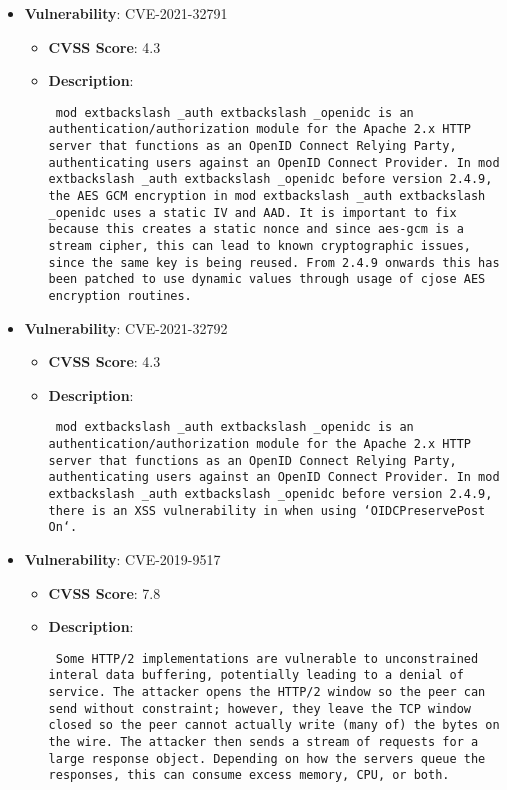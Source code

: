 \documentclass{article}
\begin{document}
\begin{itemize}
        \item \textbf{Vulnerability}: CVE-2021-32791
        \begin{itemize}
            \item \textbf{CVSS Score}:  4.3 
            \item \textbf{Description}: \parbox{\linewidth}{\texttt{ mod	extbackslash _auth	extbackslash _openidc is an authentication/authorization module for the Apache 2.x HTTP server that functions as an OpenID Connect Relying Party, authenticating users against an OpenID Connect Provider. In mod	extbackslash _auth	extbackslash _openidc before version 2.4.9, the AES GCM encryption in mod	extbackslash _auth	extbackslash _openidc uses a static IV and AAD. It is important to fix because this creates a static nonce and since aes-gcm is a stream cipher, this can lead to known cryptographic issues, since the same key is being reused. From 2.4.9 onwards this has been patched to use dynamic values through usage of cjose AES encryption routines. }}
        \end{itemize}
    
        \item \textbf{Vulnerability}: CVE-2021-32792
        \begin{itemize}
            \item \textbf{CVSS Score}:  4.3 
            \item \textbf{Description}: \parbox{\linewidth}{\texttt{ mod	extbackslash _auth	extbackslash _openidc is an authentication/authorization module for the Apache 2.x HTTP server that functions as an OpenID Connect Relying Party, authenticating users against an OpenID Connect Provider. In mod	extbackslash _auth	extbackslash _openidc before version 2.4.9, there is an XSS vulnerability in when using `OIDCPreservePost On`. }}
        \end{itemize}
    
        \item \textbf{Vulnerability}: CVE-2019-9517
        \begin{itemize}
            \item \textbf{CVSS Score}:  7.8 
            \item \textbf{Description}: \parbox{\linewidth}{\texttt{ Some HTTP/2 implementations are vulnerable to unconstrained interal data buffering, potentially leading to a denial of service. The attacker opens the HTTP/2 window so the peer can send without constraint; however, they leave the TCP window closed so the peer cannot actually write (many of) the bytes on the wire. The attacker then sends a stream of requests for a large response object. Depending on how the servers queue the responses, this can consume excess memory, CPU, or both. }}
        \end{itemize}
    

\end{itemize}
\end{document}
